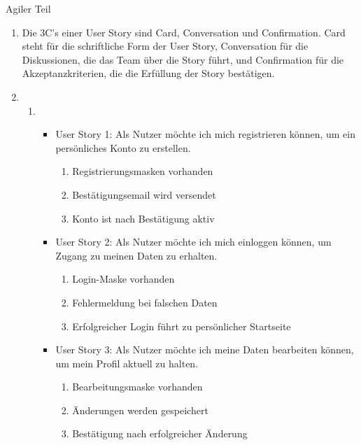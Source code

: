 \documentclass{article}
\begin{document}
\begin{exercise}{Agiler Teil}
  \begin{solution}
    \begin{enumerate}
      \item Die 3C's einer User Story sind Card, Conversation und Confirmation. Card steht für die schriftliche Form der User Story, Conversation für die Diskussionen, die das Team über die Story führt, und Confirmation für die Akzeptanzkriterien, die die Erfüllung der Story bestätigen.
      \item
            \begin{enumerate}
              \item
                    \begin{itemize}
                      \item User Story 1: Als Nutzer möchte ich mich registrieren können, um ein persönliches Konto zu erstellen.
                            \begin{enumerate}
                              \item Registrierungsmasken vorhanden
                              \item Bestätigungsemail wird versendet
                              \item Konto ist nach Bestätigung aktiv
                            \end{enumerate}
                      \item User Story 2: Als Nutzer möchte ich mich einloggen können, um Zugang zu meinen Daten zu erhalten.
                            \begin{enumerate}
                              \item Login-Maske vorhanden
                              \item Fehlermeldung bei falschen Daten
                              \item Erfolgreicher Login führt zu persönlicher Startseite
                            \end{enumerate}
                      \item User Story 3: Als Nutzer möchte ich meine Daten bearbeiten können, um mein Profil aktuell zu halten.
                            \begin{enumerate}
                              \item Bearbeitungsmaske vorhanden
                              \item Änderungen werden gespeichert
                              \item Bestätigung nach erfolgreicher Änderung

\end{enumerate}
\end{itemize}
\end{enumerate}
\end{enumerate}
\end{solution}
\end{exercise}
\end{document}
